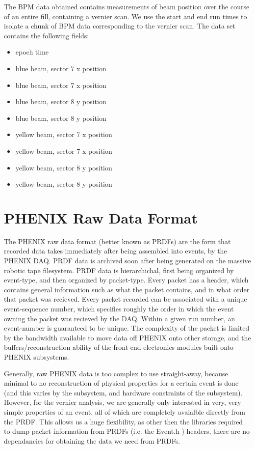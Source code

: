 The BPM data obtained contains measurements of beam position over the course of an entire
fill, containing a vernier scan. We use the start and end run times to isolate a chunk of
BPM data corresponding to the vernier scan. The data set contains the following fields:
\begin{itemize}
\item epoch time
\item blue beam, sector 7 x position
\item blue beam, sector 7 x position
\item blue beam, sector 8 y position
\item blue beam, sector 8 y position
\item yellow beam, sector 7 x position
\item yellow beam, sector 7 x position
\item yellow beam, sector 8 y position
\item yellow beam, sector 8 y position
\end{itemize}




\section{PHENIX Raw Data Format} 

The PHENIX raw data format (better known as PRDFs) are the form that recorded data takes
immediately after being assembled into events, by the PHENIX DAQ. PRDF data is archived
soon after being generated on the massive robotic tape filesystem. PRDF data is
hierarchichal, first being organized by event-type, and then organized by packet-type.
Every packet has a header, which contains general information such as what the packet
contains, and in what order that packet was recieved. Every packet recorded can be
associated with a unique event-sequence number, which specifies roughly the order in which
the event owning the packet was recieved by the DAQ. Within a given run number, an
event-number is guaranteed to be unique. The complexity of the packet is limited by the
bandwidth available to move data off PHENIX onto other storage, and the
buffers/reconstruction ability of the front end electronics modules built onto PHENIX
subsystems.

Generally, raw PHENIX data is too complex to use straight-away, because minimal to no
reconstruction of physical properties for a certain event is done (and this varies by the
subsystem, and hardware constraints of the subsystem). However, for the vernier analysis,
we are generally only interested in very, very simple properties of an event, all of which
are completely avaialble directly from the PRDF. This allows us a huge flexibility, as
other then the libraries required to dump packet information from PRDFs (i.e. the Event.h
) headers, there are no dependancies for obtaining the data we need from PRDFs.

